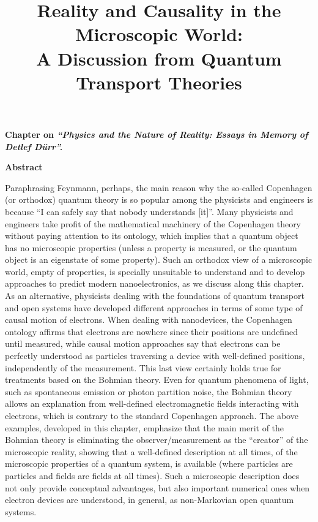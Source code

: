 \documentclass[11pt, a4paper]{article} %
\title{\vspace{-2cm} {\bf Reality and Causality in the Microscopic World:\\ A Discussion from Quantum Transport Theories}%
\vspace{-0.4cm}}
\date{\vspace{-11ex}}
\begin{document}



\maketitle






{\bf Chapter on {\em “Physics and the Nature of Reality: Essays in Memory of Detlef Dürr”.}}

\begin{center}
{\bf Abstract }
\end{center}
Paraphrasing Feynmann, perhaps, the main reason why the so-called Copenhagen (or orthodox) quantum theory is so popular among the physicists and engineers is because “I can safely say that nobody understands [it]”. Many physicists and engineers take profit of the mathematical machinery of the Copenhagen theory without paying attention to its ontology, which implies that a quantum object has no microscopic properties (unless a property is measured, or the quantum object is an eigenstate of some property). Such an orthodox view of a microscopic world, empty of properties, is specially unsuitable to understand and to develop approaches to predict modern nanoelectronics, as we discuss along this chapter. As an alternative, physicists dealing with the foundations of quantum transport and open systems have developed different approaches in terms of some type of causal motion of electrons. When dealing with nanodevices, the Copenhagen ontology affirms that electrons are nowhere since their positions are undefined until measured, while causal motion approaches say that electrons can be perfectly understood as particles traversing a device with well-defined positions, independently of the measurement. This last view certainly holds true for treatments based on the Bohmian theory. Even for quantum phenomena of light, such as spontaneous emission or photon partition noise, the Bohmian theory allows an explanation from well-defined electromagnetic fields interacting with electrons, which is contrary to the standard Copenhagen approach. The above examples, developed in this chapter, emphasize that the main merit of the Bohmian theory is eliminating the observer/measurement as the “creator” of the microscopic reality, showing that a well-defined description at all times, of the microscopic properties of a quantum system, is available (where particles are particles and fields are fields at all times). Such a microscopic description does not only provide conceptual advantages, but also important numerical ones when electron devices are understood, in general, as non-Markovian open quantum systems.   
\end{document}
